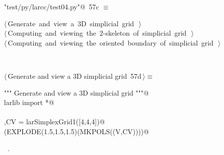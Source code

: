 \documentclass[11pt,oneside]{article}	%
\begin{document}
\begin{flushleft} \small
\begin{minipage}{\linewidth} \label{scrap105}
\protect{}\verb@"test/py/larcc/test04.py"@\nobreak\ {\footnotesize 57c }$\equiv$
\vspace{-1ex}
\begin{list}{}{} \item
\mbox{}\verb@@\hbox{$\langle\,$Generate and view a 3D simplicial grid\nobreak\ {\footnotesize {}}$\,\rangle$}\verb@@\\
\mbox{}\verb@@\hbox{$\langle\,$Computing and viewing the 2-skeleton of simplicial grid\nobreak\ {\footnotesize {}}$\,\rangle$}\verb@@\\
\mbox{}\verb@@\hbox{$\langle\,$Computing and viewing the oriented boundary of simplicial grid\nobreak\ {\footnotesize {}}$\,\rangle$}\verb@@\\
\mbox{}\verb@@{\NWsep}
\end{list}
\vspace{-2ex}
\end{minipage}\\[4ex]
\end{flushleft}


\begin{flushleft} \small \label{scrap106}
\protect{}$\langle\,$Generate and view a 3D simplicial grid\nobreak\ {\footnotesize 57d}$\,\rangle\equiv$
\vspace{-1ex}
\begin{list}{}{} \item
\mbox{}\verb@""" Generate and view a 3D simplicial grid """@\\
\mbox{}\verb@from larlib import *@\\
\mbox{}\verb@@\\
\mbox{}\verb@V,CV = larSimplexGrid1([4,4,4])@\\
\mbox{}\verb@VIEW(EXPLODE(1.5,1.5,1.5)(MKPOLS((V,CV))))@\\
\mbox{}\verb@@{\NWsep}
\end{list}
\vspace{-1ex}
\footnotesize\addtolength{\baselineskip}{-1ex}
\begin{list}{}{\setlength{\itemsep}{-\parsep}\setlength{\itemindent}{-\leftmargin}}
\item \NWtxtMacroRefIn\ .
\end{list}
\end{flushleft}
\end{document}
